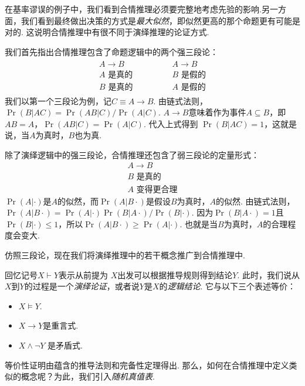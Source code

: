 在基率谬误的例子中，我们看到合情推理必须要完整地考虑先验的影响.另一方面，我们看到最终做出决策的方式是\textit{最大似然}，即似然更高的那个命题更有可能是对的. 这说明合情推理中有很不同于演绎推理的论证方式.

我们首先指出合情推理包含了命题逻辑中的两个强三段论：
        \[
        \begin{array}{c}
            \begin{array}{c}  
                A \to B \\ A\text{ 是真的} \\ \hline B\text{ 是真的}
            \end{array} 
            \qquad \qquad 
            \begin{array}{c}  
                A \to B \\ B\text{ 是假的} \\ \hline A\text{ 是假的}
            \end{array}
        \end{array} 
    \]
我们以第一个三段论为例，记$C \equiv A \to B$. 由链式法则，$\Pr(B|AC) = \Pr(AB|C) / \Pr(A|C)$. $A \to B$意味着作为事件$A\subseteq B$，即$AB=A$，$\Pr(AB|C) = \Pr(A|C)$. 代入上式得到 $\Pr(B|AC) = 1$，这就是说，当$A$为真时，$B$也为真.

除了演绎逻辑中的强三段论，合情推理还包含了弱三段论的定量形式：
    \[\begin{array}{c}  
            A \to B \\ B\text{ 是真的} \\ \hline A\text{ 变得更合理}
        \end{array}\]
$\Pr(A|\cdot)$是$A$的似然，而$\Pr(A|B\cdot)$是假设$B$为真时，$A$的似然. 由链式法则，$\Pr(A|B\cdot) = \Pr(A|\cdot)\Pr(B|A\cdot)/\Pr(B|\cdot)$. 因为$\Pr(B|A\cdot) = 1$且$\Pr(B|\cdot)\leq 1$，所以$\Pr(A|B\cdot) \geq \Pr(A|\cdot)$. 也就是当$B$为真时，$A$的合理程度会变大.

仿照三段论，现在我们将演绎推理中的若干概念推广到合情推理中. 

回忆记号$X\vdash Y$表示从前提为 $X$出发可以根据推导规则得到结论$Y$. 此时，我们说从$X$到$Y$的过程是一个\textit{演绎论证}，或者说$Y$是$X$的\textit{逻辑结论}. 它与以下三个表述等价：
    \begin{itemize}
        \item $X\vDash Y$.
        \item  $X\to Y$是重言式.
        \item $X\wedge \neg Y$ 是矛盾式.
    \end{itemize}
等价性证明由蕴含的推导法则和完备性定理得出. 那么，如何在合情推理中定义类似的概念呢？为此，我们引入\textit{随机真值表}. 

